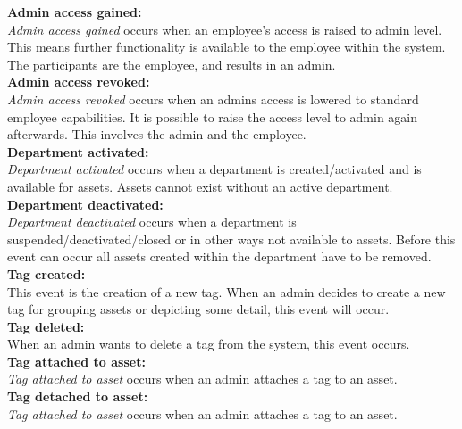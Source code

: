 \textbf{Admin access gained:}\\
\textit{Admin access gained} occurs when an employee's access is raised to admin level. This means further functionality is available to the employee within the system. The participants are the employee, and results in an admin.\\

\textbf{Admin access revoked:}\\
\textit{Admin access revoked} occurs when an admins access is lowered to standard employee capabilities. It is possible to raise the access level to admin again afterwards. This involves the admin and the employee.\\

\textbf{Department activated:}\\
\textit{Department activated} occurs when a department is created/activated and is available for assets. Assets cannot exist without an active department. \\

\textbf{Department deactivated:}\\
\textit{Department deactivated} occurs when a department is suspended/deactivated/closed or in other ways not available to assets. Before this event can occur all assets created within the department have to be removed. \\

\textbf{Tag created:}\\
This event is the creation of a new tag. When an admin decides to create a new tag for grouping assets or depicting some detail, this event will occur.\\

\textbf{Tag deleted:}\\
When an admin wants to delete a tag from the system, this event occurs.\\

\textbf{Tag attached to asset:}\\
\textit{Tag attached to asset} occurs when an admin attaches a tag to an asset.\\

\textbf{Tag detached to asset:}\\
\textit{Tag attached to asset} occurs when an admin attaches a tag to an asset.